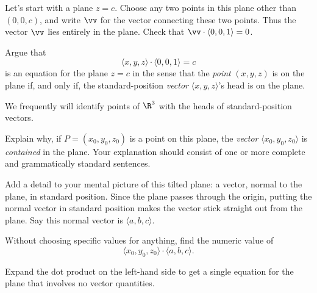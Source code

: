 \documentclass[12pt]{exam}
\theoremstyle{definition}
\begin{document}
\begin{questions}

\question Let's start with a plane $z = c$. Choose any two points in this plane other than $(0,0,c)$, and write $\vv$ for the vector connecting these two points. Thus the vector $\vv$ lies entirely in the plane. Check that $\vv \cdot \langle 0, 0, 1 \rangle = 0$.

\question Argue that 
\[
    \langle x, y, z \rangle \cdot \langle 0, 0, 1 \rangle = c
\]
is an equation for the plane $z = c$ in the sense that the \emph{point} $(x, y, z)$ is on the plane if, and only if, the standard-position \emph{vector} $\langle x, y, z \rangle$'s head is on the plane.

We frequently will identify points of $\R^3$ with the heads of standard-position vectors.

\newpage


\question Explain why, if $P = (x_0, y_0, z_0)$ is a point on this plane, the \emph{vector} $\langle x_0, y_0, z_0 \rangle$ is \emph{contained} in the plane. Your explanation should consist of one or more complete and grammatically standard sentences.

\question Add a detail to your mental picture of this tilted plane: a vector, normal to the plane, in standard position. Since the plane passes through the origin, putting the normal vector in standard position makes the vector stick straight out from the plane. Say this normal vector is $\langle a, b, c \rangle$.

\question Without choosing specific values for anything, find the numeric value of
\begin{equation*}
   \langle x_0, y_0, z_0 \rangle \cdot \langle a, b, c \rangle.
\end{equation*}

\question Expand the dot product on the left-hand side to get a single equation for the plane that involves no vector quantities.

\end{questions}
\end{document}
